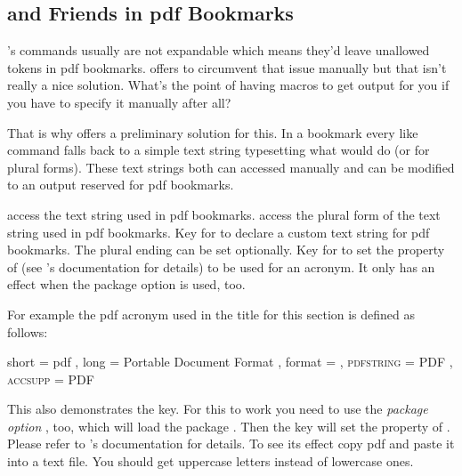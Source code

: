 \documentclass[DIV10,toc=index,toc=bib,hyperfootnotes=false]{cnpkgdoc}
\makeatletter
\providecommand*\sinceversion[1]{%
  \@bsphack
  \marginnote{%
    \footnotesize\sffamily\RaggedRight
    \textcolor{black!75}{Introduced in version~#1}}%
  \@esphack}
\makeatother
\begin{document}
\subsection{ and Friends in \acs*{pdf} Bookmarks}
\noindent\sinceversion{0.5}\acro's commands usually are not expandable which
means they'd leave unallowed tokens in \acs{pdf} bookmarks. 
offers  to circumvent that issue manually but that isn't
really a nice solution. What's the point of having macros to get output for you
if you have to specify it manually after all?

That is why \acro offers a preliminary solution for this. In a bookmark every
 like command falls back to a simple text string typesetting what 
would do (or  for plural forms). These text strings both can accessed
manually and can be modified to an output reserved for \acs{pdf} bookmarks.

\begin{beschreibung}
 \newline
   access the text string used in \acs{pdf} bookmarks.
 \newline
   access the plural form of the text string used in \acs{pdf} bookmarks.
 \newline
   Key for  to declare a custom text string for \acs{pdf}
   bookmarks. The plural ending can be set optionally.
 \newline
   \sinceversion{1.0}Key for  to set the 
   property of  (see 's documentation for details)
   to be used for an acronym. It only has an effect when the package option 
   is used, too.
\end{beschreibung}

For example the \acs{pdf} acronym used in the title for this section is defined
as follows:
\begin{beispiel}
  {
    short     = pdf ,
    long      = Portable Document Format ,
    format    = \scshape ,
    pdfstring = PDF ,
    accsupp   = PDF
  }
\end{beispiel}

This also demonstrates the  key. For this to work you need to use
the \emph{package option} , too, which will load the package
. Then the key  will set the 
property of . Please refer to 's documentation
for details. To see its effect copy \ac{pdf} and paste it into a text file. You
should get uppercase letters instead of lowercase ones.
\end{document}
